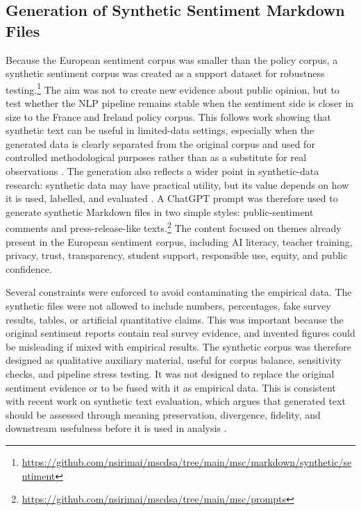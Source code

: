 \documentclass{article}
\begin{document}
\subsection{Generation of Synthetic Sentiment Markdown Files}

Because the European sentiment corpus was smaller than the policy corpus, a synthetic
sentiment corpus was created as a support dataset for robustness
testing.\footnote{\url{https://github.com/nsirimai/mscdsa/tree/main/msc/markdown/synthetic/sentiment}}
The aim was not to create new evidence about public opinion, but to test whether the
NLP pipeline remains stable when the sentiment side is closer in size to the France
and Ireland policy corpus. This follows work showing that synthetic text can be
useful in limited-data settings, especially when the generated data is clearly
separated from the original corpus and used for controlled methodological purposes
rather than as a substitute for real observations
\cite{halterman2025synthetically,chen2023empirical}. The generation also reflects a
wider point in synthetic-data research: synthetic data may have practical utility,
but its value depends on how it is used, labelled, and evaluated
\cite{snoke2018general,chim2025evaluating}. A ChatGPT prompt was therefore used to
generate synthetic Markdown files in two simple styles: public-sentiment comments and
press-release-like
texts.\footnote{\url{https://github.com/nsirimai/mscdsa/tree/main/msc/prompts}} The
content focused on themes already present in the European sentiment corpus, including
AI literacy, teacher training, privacy, trust, transparency, student support,
responsible use, equity, and public confidence.

Several constraints were enforced to avoid contaminating the empirical data. The
synthetic files were not allowed to include numbers, percentages, fake survey
results, tables, or artificial quantitative claims. This was important because the
original sentiment reports contain real survey evidence, and invented figures could
be misleading if mixed with empirical results. The synthetic corpus was therefore
designed as qualitative auxiliary material, useful for corpus balance, sensitivity
checks, and pipeline stress testing. It was not designed to replace the original
sentiment evidence or to be fused with it as empirical data. This is consistent with
recent work on synthetic text evaluation, which argues that generated text should be
assessed through meaning preservation, divergence, fidelity, and downstream
usefulness before it is used in analysis \cite{chim2025evaluating,tari2026privacy}.
\end{document}
